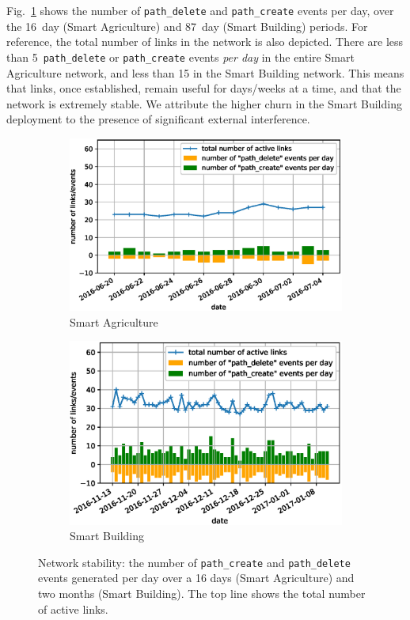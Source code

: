 \documentclass{elsarticle}
\newcommand{\building}            {Smart Building\xspace}
\newcommand{\agri}                {Smart Agriculture\xspace}
\newcommand{\pathcreate}          {{\tt path\_create}\xspace}
\newcommand{\pathdelete}          {{\tt path\_delete}\xspace}
\begin{document}

Fig.~\ref{fig:net_churn} shows the number of \pathdelete and \pathcreate events per day, over the 16~day (\agri) and 87~day (\building) periods.
For reference, the total number of links in the network is also depicted.
There are less than 5~\pathdelete or \pathcreate events \textit{per day} in the entire \agri network, and less than 15 in the \building network.
This means that links, once established, remain useful for days/weeks at a time, and that the network is extremely stable.
We attribute the higher churn in the \building deployment to the presence of significant external interference.

\begin{figure}
    \centering
    \begin{subfigure}[h]{0.49\textwidth}
        \includegraphics[width=\columnwidth]{net_churn_agri.eps}
        \caption{\agri}
    \end{subfigure}
    \begin{subfigure}[h]{0.49\textwidth}
        \includegraphics[width=\columnwidth]{net_churn_building.eps}
        \caption{\building}
    \end{subfigure}    
    \caption{
        Network stability: the number of \pathcreate and \pathdelete events generated per day over a 16 days (\agri) and two months (\building).
        The top line shows the total number of active links.
    }
    \label{fig:net_churn}
\end{figure}
\end{document}
